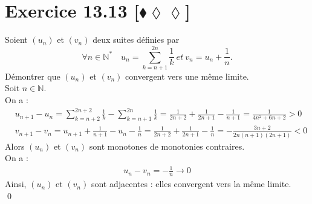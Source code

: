 \documentclass[10pt]{article}
\begin{document}
\section*{Exercice 13.13 [$\blacklozenge\lozenge\lozenge$]}
\begin{tcolorbox}[enhanced, width=7.6in, center, size=fbox, fontupper=\large, drop shadow southwest]
    Soient $(u_n)$ et $(v_n)$ deux suites définies par
    \begin{equation*}
        \forall n \in \mathbb{N}^* \quad u_n = \sum_{k=n+1}^{2n}\frac{1}{k} ~ et ~ v_n = u_n + \frac{1}{n}.
    \end{equation*}
    Démontrer que $(u_n)$ et $(v_n)$ convergent vers une même limite.\\
    Soit $n\in\mathbb{N}$.\\
    On a :
    \begin{align*}
        &u_{n+1} - u_n = \sum_{k=n+2}^{2n+2}\frac{1}{k} - \sum_{k=n+1}^{2n}\frac{1}{k}=\frac{1}{2n+2} + \frac{1}{2n+1} - \frac{1}{n+1} = \frac{1}{4n^2 + 6n + 2} > 0\\
        &v_{n+1} - v_n = u_{n+1} + \frac{1}{n+1} - u_{n} - \frac{1}{n} = \frac{1}{2n+2} + \frac{1}{2n+1} - \frac{1}{n} = -\frac{3n+2}{2n(n+1)(2n+1)}<0
    \end{align*}
    Alors $(u_n)$ et $(v_n)$ sont monotones de monotonies contraires.\\
    On a :
    \begin{align*}
        u_n - v_n = -\frac{1}{n} \longrightarrow 0
    \end{align*}
    Ainsi, $(u_n)$ et $(v_n)$ sont adjacentes : elles convergent vers la même limite.\\
    \qed
\end{tcolorbox}
\end{document}
